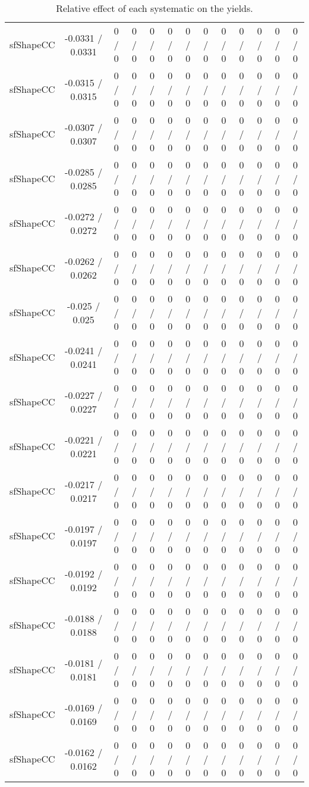 \documentclass[10pt]{article}
\begin{document}
\begin{table}[htbp]
\begin{center}
\begin{tabular}{|c|c|c|c|c|c|c|c|c|c|c|c|c|}
  sfShapeCC & -0.0331 / 0.0331 & 0 / 0 & 0 / 0 & 0 / 0 & 0 / 0 & 0 / 0 & 0 / 0 & 0 / 0 & 0 / 0 & 0 / 0 & 0 / 0 & 0 / 0 \\ 
  sfShapeCC & -0.0315 / 0.0315 & 0 / 0 & 0 / 0 & 0 / 0 & 0 / 0 & 0 / 0 & 0 / 0 & 0 / 0 & 0 / 0 & 0 / 0 & 0 / 0 & 0 / 0 \\ 
  sfShapeCC & -0.0307 / 0.0307 & 0 / 0 & 0 / 0 & 0 / 0 & 0 / 0 & 0 / 0 & 0 / 0 & 0 / 0 & 0 / 0 & 0 / 0 & 0 / 0 & 0 / 0 \\ 
  sfShapeCC & -0.0285 / 0.0285 & 0 / 0 & 0 / 0 & 0 / 0 & 0 / 0 & 0 / 0 & 0 / 0 & 0 / 0 & 0 / 0 & 0 / 0 & 0 / 0 & 0 / 0 \\ 
  sfShapeCC & -0.0272 / 0.0272 & 0 / 0 & 0 / 0 & 0 / 0 & 0 / 0 & 0 / 0 & 0 / 0 & 0 / 0 & 0 / 0 & 0 / 0 & 0 / 0 & 0 / 0 \\ 
  sfShapeCC & -0.0262 / 0.0262 & 0 / 0 & 0 / 0 & 0 / 0 & 0 / 0 & 0 / 0 & 0 / 0 & 0 / 0 & 0 / 0 & 0 / 0 & 0 / 0 & 0 / 0 \\ 
  sfShapeCC & -0.025 / 0.025 & 0 / 0 & 0 / 0 & 0 / 0 & 0 / 0 & 0 / 0 & 0 / 0 & 0 / 0 & 0 / 0 & 0 / 0 & 0 / 0 & 0 / 0 \\ 
  sfShapeCC & -0.0241 / 0.0241 & 0 / 0 & 0 / 0 & 0 / 0 & 0 / 0 & 0 / 0 & 0 / 0 & 0 / 0 & 0 / 0 & 0 / 0 & 0 / 0 & 0 / 0 \\ 
  sfShapeCC & -0.0227 / 0.0227 & 0 / 0 & 0 / 0 & 0 / 0 & 0 / 0 & 0 / 0 & 0 / 0 & 0 / 0 & 0 / 0 & 0 / 0 & 0 / 0 & 0 / 0 \\ 
  sfShapeCC & -0.0221 / 0.0221 & 0 / 0 & 0 / 0 & 0 / 0 & 0 / 0 & 0 / 0 & 0 / 0 & 0 / 0 & 0 / 0 & 0 / 0 & 0 / 0 & 0 / 0 \\ 
  sfShapeCC & -0.0217 / 0.0217 & 0 / 0 & 0 / 0 & 0 / 0 & 0 / 0 & 0 / 0 & 0 / 0 & 0 / 0 & 0 / 0 & 0 / 0 & 0 / 0 & 0 / 0 \\ 
  sfShapeCC & -0.0197 / 0.0197 & 0 / 0 & 0 / 0 & 0 / 0 & 0 / 0 & 0 / 0 & 0 / 0 & 0 / 0 & 0 / 0 & 0 / 0 & 0 / 0 & 0 / 0 \\ 
  sfShapeCC & -0.0192 / 0.0192 & 0 / 0 & 0 / 0 & 0 / 0 & 0 / 0 & 0 / 0 & 0 / 0 & 0 / 0 & 0 / 0 & 0 / 0 & 0 / 0 & 0 / 0 \\ 
  sfShapeCC & -0.0188 / 0.0188 & 0 / 0 & 0 / 0 & 0 / 0 & 0 / 0 & 0 / 0 & 0 / 0 & 0 / 0 & 0 / 0 & 0 / 0 & 0 / 0 & 0 / 0 \\ 
  sfShapeCC & -0.0181 / 0.0181 & 0 / 0 & 0 / 0 & 0 / 0 & 0 / 0 & 0 / 0 & 0 / 0 & 0 / 0 & 0 / 0 & 0 / 0 & 0 / 0 & 0 / 0 \\ 
  sfShapeCC & -0.0169 / 0.0169 & 0 / 0 & 0 / 0 & 0 / 0 & 0 / 0 & 0 / 0 & 0 / 0 & 0 / 0 & 0 / 0 & 0 / 0 & 0 / 0 & 0 / 0 \\ 
  sfShapeCC & -0.0162 / 0.0162 & 0 / 0 & 0 / 0 & 0 / 0 & 0 / 0 & 0 / 0 & 0 / 0 & 0 / 0 & 0 / 0 & 0 / 0 & 0 / 0 & 0 / 0 \\ 
\hline 
\end{tabular} 
\caption{Relative effect of each systematic on the yields.} 
\end{center} 
\end{table} 
\end{document}
